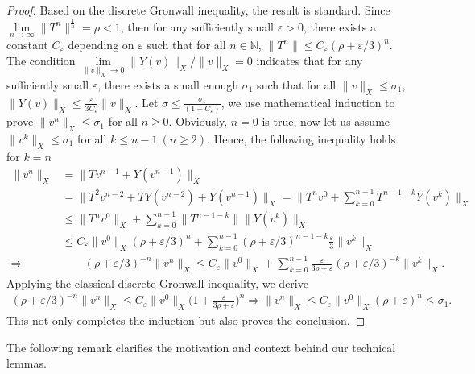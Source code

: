 \documentclass[preprint,3p]{elsarticle}
\begin{document}
\begin{proof}
	Based on the discrete Gronwall inequality, the result is standard. Since $\lim\limits_{n\to\infty}\big\|T^n\big\|^{\frac{1}{n}}=\rho<1$, then for any sufficiently small $\varepsilon > 0$, there exists a constant $C_{\varepsilon}$ depending on $\varepsilon$ such that for all $n\in\mathbb{N}$, $\big\|T^n\big\|\le C_{\varepsilon}(\rho+\varepsilon/3)^n$. The condition $\lim\limits_{\|v\|_{X}\to0}\big\|Y(v)\big\|_{X}/\|v\|_{X}=0$ indicates that for any sufficiently small $\varepsilon$, there exists a small enough $\sigma_1$ such that for all $\|v\|_X\le\sigma_1$, $\big\|Y(v)\big\|_{X}\le\frac{\varepsilon}{3C_{\varepsilon}}\big\|v\big\|_{X}$. Let $\sigma\le\frac{\sigma_1}{(1+C_{\varepsilon})}$, we use mathematical induction to prove $\|v^n\|_{X}\le\sigma_1$ for all $n\ge 0$. Obviously, $n=0$ is true, now let us assume $\|v^{k}\|_{X}\le\sigma_1$ for all $k\le n-1\ (n\ge2)$. Hence, the following inequality holds for $k=n$
	\begin{align*}
		\big\|v^{n}\big\|_{X}&=\big\|Tv^{n-1}+Y(v^{n-1})\big\|_{X}\\
		&=\big\|T^2v^{n-2}+TY(v^{n-2})+Y(v^{n-1})\big\|_{X}
		=\Bigg\|T^{n}v^{0}+\sum\limits_{k=0}^{n-1}T^{n-1-k}Y(v^{k})\Bigg\|_{X}\\
		&\le\big\|T^{n}v^{0}\big\|_{X}+\sum\limits_{k=0}^{n-1}\big\|T^{n-1-k}\big\|\big\|Y(v^{k})\big\|_{X}\\
		&\le C_{\varepsilon}\big\|v^{0}\big\|_{X}(\rho+\varepsilon/3)^{n}+\sum\limits_{k=0}^{n-1}(\rho+\varepsilon/3)^{n-1-k}\frac{\varepsilon}{3}\big\|v^{k}\big\|_{X}\\
		\Longrightarrow&\qquad (\rho+\varepsilon/3)^{-n}\big\|v^{n}\big\|_{X}\le C_{\varepsilon}\big\|v^{0}\big\|_{X}+\sum\limits_{k=0}^{n-1}\frac{\varepsilon}{3\rho+\varepsilon}(\rho+\varepsilon/3)^{-k}\big\|v^{k}\big\|_{X}.
	\end{align*}
	Applying the classical discrete Gronwall inequality, we derive
	\begin{align*}
		(\rho+\varepsilon/3)^{-n}\big\|v^{n}\big\|_{X}\le C_{\varepsilon}\|v^{0}\|_{X}\Bigg(1+\frac{\varepsilon}{3\rho+\varepsilon}\Bigg)^{n}\Longrightarrow\big\|v^n\big\|_{X}\le C_{\varepsilon}\|v^{0}\|_{X}(\rho+\varepsilon)^{n}\le\sigma_1.
	\end{align*}
	This not only completes the induction but also proves the conclusion.
\end{proof}
The following remark clarifies the motivation and context behind our technical lemmas.
\end{document}
